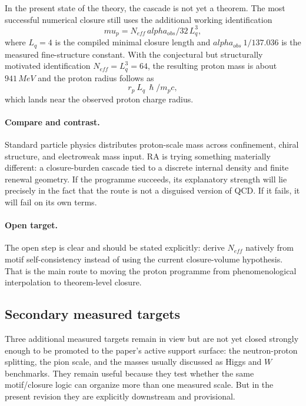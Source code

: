 \documentclass[11pt]{article}
\DeclareRobustCommand{\hbar}{\ensuremath{\hslash}}
\def\mu{mu}%
\def\alpha{alpha}%
\def\mathrm#1{#1}%
\def\frac#1#2{#1/#2}%
\def\approx{~}%
\begin{document}
In the present state of the theory, the cascade is not yet a theorem. The most successful numerical closure still uses the additional working identification
\begin{equation}
\mu_p = \frac{N_{\mathrm{eff}}\,\alpha_{\mathrm{obs}}}{32\,L_q^3},
\end{equation}
where $L_q=4$ is the compiled minimal closure length and $\alpha_{\mathrm{obs}}\approx 1/137.036$ is the measured fine-structure constant. With the conjectural but structurally motivated identification $N_{\mathrm{eff}}=L_q^3=64$, the resulting proton mass is about $941\,\mathrm{MeV}$ and the proton radius follows as
\begin{equation}
 r_p \approx L_q\,\frac{\hbar}{m_p c},
\end{equation}
which lands near the observed proton charge radius.

\paragraph{Compare and contrast.} Standard particle physics distributes proton-scale mass across confinement, chiral structure, and electroweak mass input. RA is trying something materially different: a closure-burden cascade tied to a discrete internal density and finite renewal geometry. If the programme succeeds, its explanatory strength will lie precisely in the fact that the route is not a disguised version of QCD. If it fails, it will fail on its own terms.

\paragraph{Open target.} The open step is clear and should be stated explicitly: derive $N_{\mathrm{eff}}$ natively from motif self-consistency instead of using the current closure-volume hypothesis. That is the main route to moving the proton programme from phenomenological interpolation to theorem-level closure.

\subsection{Secondary measured targets}

Three additional measured targets remain in view but are not yet closed strongly enough to be promoted to the paper's active support surface: the neutron-proton splitting, the pion scale, and the masses usually discussed as Higgs and $W$ benchmarks. They remain useful because they test whether the same motif/closure logic can organize more than one measured scale. But in the present revision they are explicitly downstream and provisional.
\end{document}
